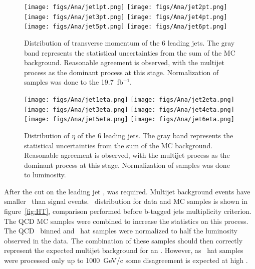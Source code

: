 \begin{figure}[!Hhtbp]
  \begin{center}
    \texttt{[image: figs/Ana/jet1pt.png]}
    \texttt{[image: figs/Ana/jet2pt.png]}
    \texttt{[image: figs/Ana/jet3pt.png]}
    \texttt{[image: figs/Ana/jet4pt.png]}
    \texttt{[image: figs/Ana/jet5pt.png]}
    \texttt{[image: figs/Ana/jet6pt.png]}
    \caption{Distribution of transverse momentum of the 6 leading jets. The gray band represents the statistical uncertainties from the sum of the MC background. Reasonable agreement is observed, with the multijet process as the dominant process at this stage. Normalization of samples was done to the 19.7~fb$^{-1}$.}
    \label{fig:6jpt}
  \end{center}
\end{figure}

\begin{figure}[!Hhtbp]
  \begin{center}
    \texttt{[image: figs/Ana/jet1eta.png]}
    \texttt{[image: figs/Ana/jet2eta.png]}
    \texttt{[image: figs/Ana/jet3eta.png]}
    \texttt{[image: figs/Ana/jet4eta.png]}
    \texttt{[image: figs/Ana/jet5eta.png]}
    \texttt{[image: figs/Ana/jet6eta.png]}
    \caption{Distribution of $\eta$ of the 6 leading jets. The gray band represents the statistical uncertainties from the sum of the MC background. Reasonable agreement is observed, with the multijet process as the dominant process at this stage. Normalization of samples was done to luminosity.}
    \label{fig:6jeta}
  \end{center}
\end{figure}

After the cut on the leading jet \pt,  was required. Multijet background events have smaller \HT~than signal events. \HT~distribution for data and MC samples is shown in figure~\ref{fig:HT}, comparison performed before b-tagged jets multiplicity criterion. The QCD MC samples were combined to increase the statistics on this process. The QCD \HT~binned and \pt~hat samples were normalized to half the luminosity observed in the data. The combination of these samples should then correctly represent the expected multijet background for an . However, as \pt~hat samples were processed only up to 1000~GeV/c some disagreement is expected at high \HT.

